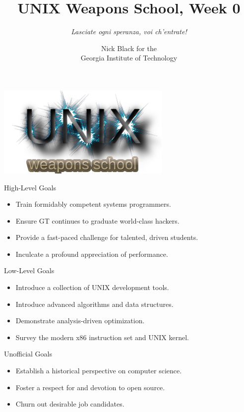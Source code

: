 \documentclass[handout]{beamer}
\title{UNIX Weapons School, Week 0}
\subtitle{{\it Lasciate ogni speranza, voi ch'entrate!}}
\author{Nick Black for the\\
Georgia Institute of Technology
}
\begin{document}
\begin{frame}
\titlepage
\begin{center}
\includegraphics[scale=0.33]{uws.png}
\end{center}
\end{frame}

\begin{frame}{High-Level Goals}
\begin{itemize}
\item Train formidably competent systems programmers.
\item Ensure GT continues to graduate world-class hackers.
\item Provide a fast-paced challenge for talented, driven students. 
\item Inculcate a profound appreciation of performance.
\end{itemize}
\end{frame}

\begin{frame}{Low-Level Goals}
\begin{itemize}
\item Introduce a collection of UNIX development tools.
\item Introduce advanced algorithms and data structures.
\item Demonstrate analysis-driven optimization.
\item Survey the modern x86 instruction set and UNIX kernel.
\end{itemize}
\end{frame}

\begin{frame}{Unofficial Goals}
\begin{itemize}
\item Establish a historical perspective on computer science.
\item Foster a respect for and devotion to open source.
\item Churn out desirable job candidates.
\end{itemize}
\end{frame}
\end{document}
